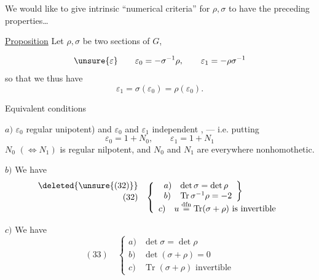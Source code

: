 We would like to give intrinsic ``numerical criteria'' for $\rho,\sigma$ to have the preceding properties\ldots

\uline{Proposition} Let $\rho,\sigma$ be two  sections of $G$,

 
\[
\unsure{\varepsilon}\qquad \varepsilon_0=-\sigma^{-1}\rho,\qquad \varepsilon_1=-\rho\sigma^{-1}
\]
so that we thus have
\[
\varepsilon_1=\sigma(\varepsilon_0)=\rho(\varepsilon_0).
\]

Equivalent conditions

$a)$  $\varepsilon_0$        regular unipotent) and  $\varepsilon_0$ and $\varepsilon_1$   independent , --- i.e. putting
\[
\varepsilon_0=1+N_0,\qquad \varepsilon_1=1+N_1
\]
$N_0$ $(\Leftrightarrow N_1)$ is regular nilpotent, and $N_0$ and $N_1$ are everywhere nonhomothetic.

$b)$ We have
\[
\begin{array}{rl}
\deleted{\unsure{(32)}}&\\[-1.2em]
(32)&\left\{\begin{array}{l}
\left.\begin{array}{ll}
a)&\det\sigma=\det\rho\\
b)&\operatorname{Tr}\sigma^{-1}\rho=-2
\end{array}\right\}\\
c)\quad u\overset{\mathrm{dfn}}{=}\operatorname{Tr}(\sigma+\rho)\text{ is invertible}
\end{array}\right.
\end{array}
\]
 

$c)$ We have \deleted{$\det\sigma=\det\rho$}
\[
(33)\quad\left\{\begin{array}{ll}
a)&\det\sigma=\det\rho\\
b)&\det(\sigma+\rho)=0\\
c)&\operatorname{Tr}(\sigma+\rho)\text{ invertible}
\end{array}\right.
\]

